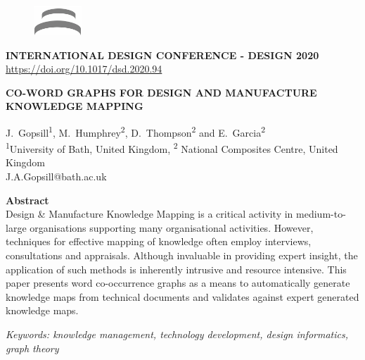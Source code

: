 {
  \titlefont
  \small
  \begin{figure}
    \raggedleft
    \vspace{-0.2cm}
    \includegraphics[width=1.8cm]{figs/design-logo.png}
  \end{figure}
  \noindent \textbf{INTERNATIONAL DESIGN CONFERENCE - DESIGN 2020}\\
  \url{https://doi.org/10.1017/dsd.2020.94}

  \vspace{2cm}

  \Large\noindent\textbf{CO-WORD GRAPHS FOR DESIGN AND MANUFACTURE KNOWLEDGE MAPPING}

  \vspace{1cm}

  \normalsize \noindent J.\ Gopsill\textsuperscript{1}, M.\ Humphrey\textsuperscript{2}, D.\ Thompson\textsuperscript{2} and E.\ Garcia\textsuperscript{2} \\[0.2cm]
  \footnotesize \noindent \textsuperscript{1}University of Bath, United Kingdom, \textsuperscript{2} National Composites Centre, United Kingdom \\[0.1cm]
  \footnotesize \noindent J.A.Gopsill@bath.ac.uk\\

  \begin{mdframed}[backgroundcolor=gray!20] 
    \normalsize \noindent \textbf{Abstract} \\
    \normalfont Design \& Manufacture Knowledge Mapping is a critical activity in medium-to-large organisations supporting many organisational activities.
    However, techniques for effective mapping of knowledge often employ interviews, consultations and appraisals.
    Although invaluable in providing expert insight, the application of such methods is inherently intrusive and resource intensive.
    This paper presents word co-occurrence graphs as a means to automatically generate knowledge maps from technical documents and validates against expert generated knowledge maps.
  \end{mdframed}

  \small \noindent \textit{Keywords: knowledge management, technology development, design informatics, graph theory}

  \vspace{0cm}
}
